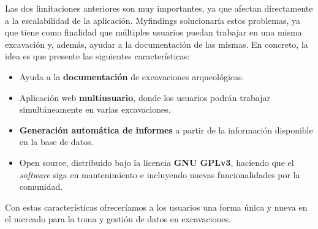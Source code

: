Las dos limitaciones anteriores son muy importantes, ya que afectan directamente a la
escalabilidad de la aplicación. Myfindings solucionaría estos problemas, ya que tiene como
finalidad que múltiples usuarios puedan trabajar en una misma excavación y, además, ayudar a
la documentación de las mismas. En concreto, la idea es que presente las siguientes
características:

    \begin{itemize}
        \item Ayuda a la \textbf{documentación} de excavaciones arqueológicas.
        \item Aplicación web \textbf{multiusuario}, donde los usuarios podrán trabajar
        simultáneamente en varias excavaciones.
        \item \textbf{Generación automática de informes} a partir de la información 
        disponible en la base de datos.
        \item Open source, distribuido bajo la licencia \textbf{GNU GPLv3}, haciendo que
        el \textit{software} siga en mantenimiento e incluyendo nuevas funcionalidades por
        la comunidad.
    \end{itemize}

Con estas características ofreceríamos a los usuarios una forma única y nueva en el
mercado para la toma y gestión de datos en excavaciones.
